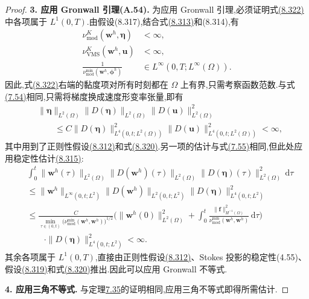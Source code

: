 \begin{proof}
\textbf{3. 应用 Gronwall 引理(A.54).} 为应用 Gronwall 引理,必须证明式\hyperref[eq:vms-coarse-projection-error-differential-inequality]{(8.322)}中各项属于 $L^1(0,T)$.由假设(8.317),结合式\hyperref[eq:vms-coarse-projection-modified-viscosity]{(8.313)}和(8.314),有
\[
 \begin{aligned}
 \nu_{\mathrm{mod}}^K(\bm w^h,\symbf{\eta})&<\infty,\\
 \nu_{\mathrm{VMS}}^K(\bm w^h,\bm u)&<\infty,\\
 \frac{1}{\nu_{\mathrm{mod}}^{\min}(\bm w^h,\symbf{\phi}^h)}
   &\in L^\infty(0,T;L^\infty(\Omega)).
 \end{aligned}
\]
因此,式\hyperref[eq:vms-coarse-projection-error-differential-inequality]{(8.322)}右端的黏度项对所有时刻都在 $\Omega$ 上有界,只需考察函数范数.与式\hyperref[eq:time-dependent-fem-error-integrability-eta]{(7.54)}相同,只需将梯度换成速度形变率张量,即有
\[
\begin{aligned}
 &\|\symbf{\eta}\|_{L^2(\Omega)}
   \|D(\symbf{\eta})\|_{L^2(\Omega)}
   \|D(\bm u)\|_{L^2(\Omega)}^2\\
 &\qquad\le C\|D(\symbf{\eta})\|_{L^4(0,t;L^2(\Omega))}^2
          \|D(\bm u)\|_{L^4(0,t;L^2(\Omega))}^2<\infty,
\end{aligned}
\]
其中用到了正则性假设\hyperref[eq:vms-coarse-projection-solution-regularity]{(8.312)}和式\hyperref[eq:vms-coarse-projection-stokes-gradient-regularity]{(8.320)}.另一项的估计与式\hyperref[eq:time-dependent-fem-error-integrability-uh]{(7.55)}相同,但此处应用稳定性估计\hyperref[eq:vms-coarse-projection-stability-estimate]{(8.315)}:
\[
\begin{aligned}
 &\int_0^t\|\bm w^h(\tau)\|_{L^2(\Omega)}
       \|D(\bm w^h)(\tau)\|_{L^2(\Omega)}
       \|D(\symbf{\eta})(\tau)\|_{L^2(\Omega)}^2\,\mathrm d\tau\\
 &\le \|\bm w^h\|_{L^\infty(0,t;L^2)}
       \|D(\bm w^h)\|_{L^2(0,t;L^2)}
       \|D(\symbf{\eta})\|_{L^4(0,t;L^2)}^2\\
 &\le \frac{C}{\displaystyle\min_{\tau\in(0,t)}
       \bigl(\nu_{\mathrm{mod}}^{\min}(\bm w^h,\bm w^h)\bigr)^{1/2}}
       \Biggl(\|\bm w^h(0)\|_{L^2(\Omega)}^2
       +\int_0^t\frac{\|\bm f\|_{H^{-1}(\Omega)}^2}
         {\nu_{\mathrm{mod}}^{\min}(\bm w^h,\bm w^h)}\,\mathrm d\tau\Biggr)\\
 &\qquad\cdot\|D(\symbf{\eta})\|_{L^4(0,t;L^2)}^2<\infty.
\end{aligned}
\]
其余各项属于 $L^1(0,T)$,直接由正则性假设\hyperref[eq:vms-coarse-projection-solution-regularity]{(8.312)}、Stokes 投影的稳定性(4.55)、假设\hyperref[eq:vms-coarse-projection-stokes-time-regularity]{(8.319)}和式\hyperref[eq:vms-coarse-projection-stokes-gradient-regularity]{(8.320)}推出.因此可以应用 Gronwall 不等式.

\textbf{4. 应用三角不等式.} 与定理\hyperref[thm:time-dependent-fem-velocity-error]{7.35}的证明相同,应用三角不等式即得所需估计.
\end{proof}

